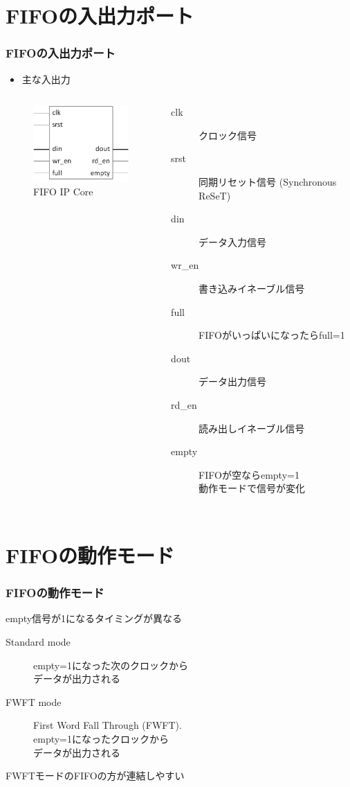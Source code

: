 ﻿\documentclass[dvipdfmx]{beamer}
\begin{document}
\section{FIFOの入出力ポート}
\begin{frame}
	\frametitle{FIFOの入出力ポート}
	\begin{itemize}
		\item
			主な入出力
	\end{itemize}
	\vfill
	\begin{columns}
			\begin{figure}[ht]
				\centering
				\includegraphics[width=4cm]{../img/fifo_ip.pdf}
				\caption{FIFO IP Core}
				\label{img:fifo_ip}
			\end{figure}
		\begin{description}
			\item[clk]\mbox{}
				クロック信号
			\item[srst]\mbox{}
				同期リセット信号 (Synchronous ReSeT)
			\item[din]\mbox{}
				データ入力信号
			\item[wr\_en]\mbox{}
				書き込みイネーブル信号
			\item[full]\mbox{}
				FIFOがいっぱいになったらfull=1
			\item[dout]\mbox{}
				データ出力信号
			\item[rd\_en]\mbox{}
				読み出しイネーブル信号
			\item[empty]\mbox{}
				FIFOが空ならempty=1\\
				動作モードで信号が変化
		\end{description}
	\end{columns}
\end{frame}

\section{FIFOの動作モード}
\begin{frame}
	\frametitle{FIFOの動作モード}
	empty信号が1になるタイミングが異なる
	\vfill
	\begin{description}
		\item[Standard mode]\mbox{}
			empty=1になった次のクロックから\\
			データが出力される
		\item[FWFT mode]\mbox{}
			First Word Fall Through (FWFT).\\
			empty=1になったクロックから\\
			データが出力される
	\end{description}
	\vfill
	FWFTモードのFIFOの方が連結しやすい
\end{frame}
\end{document}
